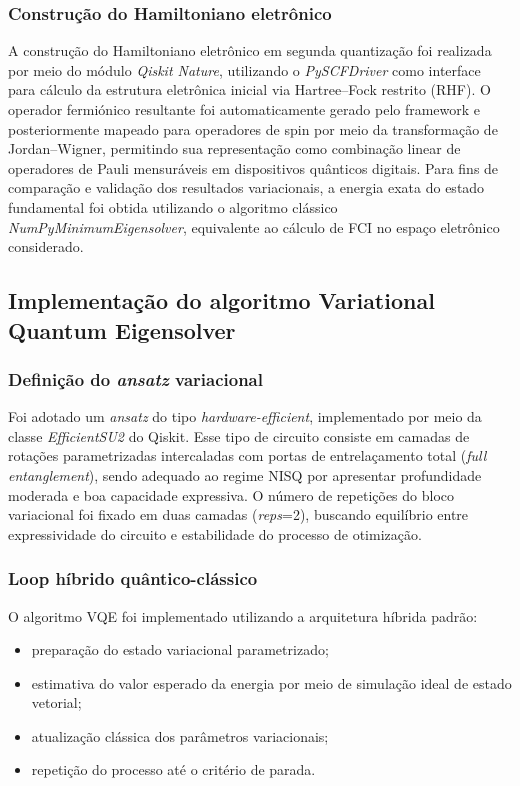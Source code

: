 \subsubsection{Construção do Hamiltoniano eletrônico}

A construção do Hamiltoniano eletrônico em segunda quantização foi realizada 
por meio do módulo \textit{Qiskit Nature}, utilizando o \textit{PySCFDriver} 
como interface para cálculo da estrutura eletrônica inicial via Hartree–Fock 
restrito (RHF).
O operador fermiónico resultante foi automaticamente gerado pelo framework e 
posteriormente mapeado para operadores de spin por meio da transformação de 
Jordan–Wigner, permitindo sua representação como combinação linear de 
operadores de Pauli mensuráveis em dispositivos quânticos digitais.
Para fins de comparação e validação dos resultados variacionais, a energia 
exata do estado fundamental foi obtida utilizando o algoritmo clássico 
\textit{NumPyMinimumEigensolver}, equivalente ao cálculo de FCI no espaço 
eletrônico considerado.

\subsection{Implementação do algoritmo Variational Quantum Eigensolver}

\subsubsection{Definição do \textit{ansatz} variacional}

Foi adotado um \textit{ansatz} do tipo \textit{hardware-efficient}, 
implementado por 
meio da classe \textit{EfficientSU2} do Qiskit. Esse tipo de circuito 
consiste em camadas de rotações parametrizadas intercaladas com portas de 
entrelaçamento total (\textit{full entanglement}), sendo adequado ao regime 
NISQ por apresentar profundidade moderada e boa capacidade expressiva.
O número de repetições do bloco variacional foi fixado em duas camadas 
(\textit{reps}=2), buscando equilíbrio entre expressividade do circuito e 
estabilidade do processo de otimização.

\subsubsection{Loop híbrido quântico-clássico}

O algoritmo VQE foi implementado utilizando a arquitetura híbrida padrão:

\begin{itemize}
\item preparação do estado variacional parametrizado;
\item estimativa do valor esperado da energia por meio de simulação ideal de 
estado vetorial;
\item atualização clássica dos parâmetros variacionais;
\item repetição do processo até o critério de parada.
\end{itemize}

